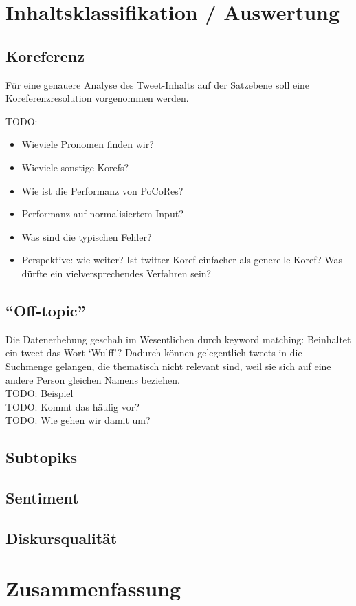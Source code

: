 \documentclass[11pt]{article}
\begin{document}
\section{Inhaltsklassifikation / Auswertung}

\subsection{Koreferenz}
Für eine genauere Analyse des Tweet-Inhalts auf der Satzebene soll
eine Koreferenzresolution vorgenommen werden.

TODO:
\begin{itemize}
\item Wieviele Pronomen finden wir?
\item Wieviele sonstige Korefs?
\item Wie ist die Performanz von PoCoRes?
\item Performanz auf normalisiertem Input?
\item Was sind die typischen Fehler?
\item Perspektive: wie weiter? Ist twitter-Koref einfacher als
  generelle Koref? Was dürfte ein vielversprechendes Verfahren sein?
\end{itemize}

\subsection{``Off-topic''}
Die Datenerhebung geschah im Wesentlichen durch keyword matching:
Beinhaltet ein tweet das Wort `Wulff'? Dadurch können gelegentlich
tweets in die Suchmenge gelangen, die thematisch nicht relevant sind,
weil sie sich auf eine andere Person gleichen Namens beziehen.\\
TODO: Beispiel\\
TODO: Kommt das häufig vor?\\
TODO: Wie gehen wir damit um?

\subsection{Subtopiks}

\subsection{Sentiment}

\subsection{Diskursqualität}

\section{Zusammenfassung}






\begin{small}




\end{small}
\end{document}
